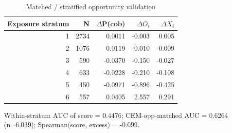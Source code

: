 \begin{table}[htbp]\centering
\caption{Matched / stratified opportunity validation}
\label{tab:opp_matched}
\begin{tabular}{rrrrr}\hline
Exposure stratum & N & $\Delta$P(cob) & $\Delta O_i$ & $\Delta X_i$ \\\hline
1 & 2734 & 0.0011 & -0.003 & 0.005 \\
2 & 1076 & 0.0119 & -0.010 & -0.009 \\
3 & 590 & -0.0370 & -0.150 & -0.027 \\
4 & 633 & -0.0228 & -0.210 & -0.108 \\
5 & 450 & -0.0971 & -0.896 & -0.425 \\
6 & 557 & 0.0405 & 2.557 & 0.291 \\
\hline\end{tabular}
\begin{tablenotes}\footnotesize\item Within-stratum AUC of score = 0.4476; CEM-opp-matched AUC = 0.6264 (n=6,039); Spearman(score, excess) = -0.099.\end{tablenotes}
\end{table}
